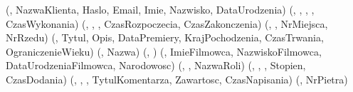 \begin{relacje}
    (, NazwaKlienta, Haslo, Email, Imie, Nazwisko, DataUrodzenia)
    (, , , , CzasWykonania)
    (, , , CzasRozpoczecia, CzasZakonczenia)
    (, , NrMiejsca, NrRzedu)
    (, Tytul, Opis, DataPremiery, KrajPochodzenia, CzasTrwania, OgraniczenieWieku)
    (, Nazwa)
    (, )
    (, ImieFilmowca, NazwiskoFilmowca, DataUrodzeniaFilmowca, Narodowosc)
    (, , NazwaRoli)
    (, , , Stopien, CzasDodania)
    (, , , TytulKomentarza, Zawartosc, CzasNapisania)
    (, NrPietra)
\end{relacje}
